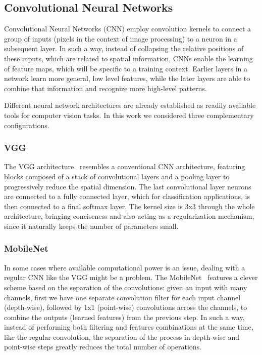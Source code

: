 \documentclass[sn-basic]{sn-jnl}%
\theoremstyle{thmstyleone}%
\theoremstyle{thmstyletwo}%
\theoremstyle{thmstylethree}%
\begin{document}
\subsection{Convolutional Neural Networks}

Convolutional Neural Networks (CNN) employ convolution kernels to connect a group of inputs (pixels in the context of image processing) to a neuron in a subsequent layer. In such a way, instead of collapsing the relative positions of these inputs, which are related to spatial information, CNNs enable the learning of feature maps, which will be specific to a training context. Earlier layers in a network learn more general, low level features, while the later layers are able to combine that information and recognize more high-level patterns.

Different neural network architectures are already established as readily available tools for computer vision tasks. In this work we considered three complementary configurations.

\subsubsection{VGG}
The VGG architecture~\citep{vgg-paper} resembles a conventional CNN architecture, featuring blocks composed of a stack of convolutional layers and a pooling layer to progressively reduce the spatial dimension. The last convolutional layer neurons are connected to a fully connected layer, which for classification applications, is then connected to a final softmax layer. The kernel size is 3x3 through the whole architecture, bringing conciseness and also acting as a regularization mechanism, since it naturally keeps the number of parameters small.


\subsubsection{MobileNet}
In some cases where available computational power is an issue, dealing with a regular CNN like the VGG might be a problem. The MobileNet~\citep{mobilenet-paper} features a clever scheme based on the separation of the convolutions: given an input with many channels, first we have one separate convolution filter for each input channel (depth-wise), followed by 1x1 (point-wise) convolutions across the channels, to combine the outputs (learned features) from the previous step. In such a way, instead of performing both filtering and features combinations at the same time, like the regular convolution, the separation of the process in depth-wise and point-wise steps greatly reduces the total number of operations.
\end{document}
